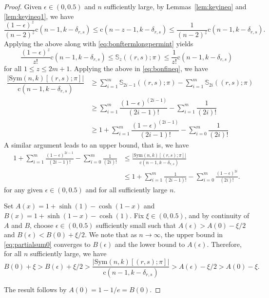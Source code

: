 \documentclass[10pt,a4paper]{amsart}
\newcommand{\bb}{\mathbb}
\newcommand{\ff}[1]{^{\underline{#1}}}
\newcommand{\st}{\mathrm{c}}
\newcommand{\sym}{\mathrm{Sym}}
\begin{document}
\begin{proof}
Given $\epsilon\in (0,0.5)$ and $n$ sufficiently large, by Lemmas~\ref{lem:keyineq} and \ref{lem:keyineq1}, we have 
\[\dfrac{(1-\epsilon)^{z}}{(n-2)\ff{z}} \st(n-1,k-\delta_{r,s}) \leq \st(n-z-1,k-\delta_{r,s}) \leq \dfrac{1}{(n-2)\ff{z}} \st(n-1,k-\delta_{r,s}).\]
Applying the above along with \eqref{eq:bonftermlongpermint} yields
\begin{equation}\label{eq:bonftermlongperm}
\dfrac{(1-\epsilon)^{z}}{z!}\st(n-1,k-\delta_{r,s}) \leq \bb{S}_{z}((r,s);\pi) \leq \dfrac{1}{z!}\st(n-1,k-\delta_{r,s})
\end{equation}
for all $1\leq z\leq 2m+1$.
Applying the above in \eqref{eq:bonfineq}, we have
\begin{align*}
\dfrac{|\sym(n,k)[(r,s);\pi]|}{\st(n-1,k-\delta_{r,s})} &\geq \sum\limits_{i=1}^{m} \bb{S}_{2i-1}((r,s);\pi)-\sum\limits_{i=1}^{m} \bb{S}_{2i}((r,s);\pi) \\
&\geq \sum\limits_{i=1}^{m} \dfrac{(1-\epsilon)^{(2i-1)}}{(2i-1)!} - \sum\limits_{i=1}^{m} \dfrac{1}{(2i)!}  \\
&\geq 1+\sum\limits_{i=1}^{m} \dfrac{(1-\epsilon)^{(2i-1)}}{(2i-1)!} - \sum\limits_{i=0}^{m} \dfrac{1}{(2i)!}
\end{align*}
A similar argument leads to an upper bound, that is, we have
\begin{equation}\label{eq:partialsum0}
\begin{aligned}
1+\sum_{i=1}^{m}
\frac{(1-\epsilon)^{2i-1}}{(2i-1)!}
-\sum_{i=0}^{m}\frac{1}{(2i)!}
&\leq
\frac{|\sym(n,k)[(r,s);\pi]|}
     {\st(n-1,k-\delta_{r,s})} \\
&\leq
1+\sum_{i=1}^{m}
\frac{1}{(2i-1)!}
-\sum_{i=0}^{m}
\frac{(1-\epsilon)^{2i}}{(2i)!}.
\end{aligned}
\end{equation} for any given $\epsilon \in (0,0.5)$ and for all sufficiently large $n$. 

Set $A(x)=1+\sinh(1)-\cosh(1-x)$ and $B(x)=1+ \sinh(1-x)-\cosh(1)$. Fix $\xi\in (0,0.5)$, and by continuity of $A$ and $B$, choose $\epsilon \in (0,0.5)$ sufficiently small such that 
$A(\epsilon)>A(0)-\xi/2$  and $B(\epsilon)<B(0)+\xi/2$. We note that as $n\to \infty$, the upper bound in \eqref{eq:partialsum0} converges to $B(\epsilon)$ and the lower bound to $A(\epsilon)$. Therefore, for all $n$ sufficiently large, we have
\[B(0)+\xi>B(\epsilon)+\xi/2> \dfrac{|\sym(n,k)[(r,s);\pi]|}
     {\st(n-1,k-\delta_{r,s})}>A(\epsilon)-\xi/2>A(0)-\xi.\]

The result follows by $A(0)=1-1/e=B(0)$.
\end{proof}
\end{document}
